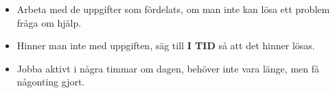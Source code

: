 \documentclass{TDP003mall}
\begin{document}
\begin{itemize}

  \item Arbeta med de uppgifter som fördelats, om man inte kan lösa ett problem fråga om hjälp.

  \item Hinner man inte med uppgiften, säg till \textbf{I TID} så att det hinner lösas.

  \item Jobba aktivt i några timmar om dagen, behöver inte vara länge, men få någonting gjort.

\end{itemize}

\newpage
\end{document}
